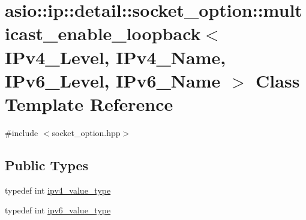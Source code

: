 \hypertarget{classasio_1_1ip_1_1detail_1_1socket__option_1_1multicast__enable__loopback}{}\section{asio\+:\+:ip\+:\+:detail\+:\+:socket\+\_\+option\+:\+:multicast\+\_\+enable\+\_\+loopback$<$ I\+Pv4\+\_\+\+Level, I\+Pv4\+\_\+\+Name, I\+Pv6\+\_\+\+Level, I\+Pv6\+\_\+\+Name $>$ Class Template Reference}
\label{classasio_1_1ip_1_1detail_1_1socket__option_1_1multicast__enable__loopback}


{\ttfamily \#include $<$socket\+\_\+option.\+hpp$>$}

\subsection*{Public Types}
\begin{DoxyCompactItemize}
\item 
typedef int \hyperlink{classasio_1_1ip_1_1detail_1_1socket__option_1_1multicast__enable__loopback_a3b6d854affad183c85edee00aec57436}{ipv4\+\_\+value\+\_\+type}
\item 
typedef int \hyperlink{classasio_1_1ip_1_1detail_1_1socket__option_1_1multicast__enable__loopback_a5156e6110cdc823d829d2bfca58f0a9a}{ipv6\+\_\+value\+\_\+type}
\end{DoxyCompactItemize}
